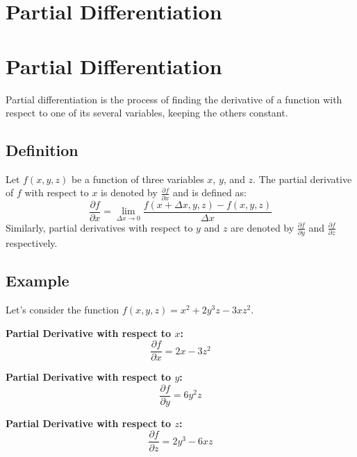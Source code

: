 \documentclass[a4paper,12pt]{article}
\begin{document}
\pagestyle{empty} 

\section{\huge\textbf{Partial Differentiation}}



\section*{Partial Differentiation}

Partial differentiation is the process of finding the derivative of a function with respect to one of its several variables, keeping the others constant.

\subsection*{Definition}

Let \( f(x, y, z) \) be a function of three variables \( x \), \( y \), and \( z \). The partial derivative of \( f \) with respect to \( x \) is denoted by \( \frac{\partial f}{\partial x} \) and is defined as:
\[
\frac{\partial f}{\partial x} = \lim_{\Delta x \to 0} \frac{f(x + \Delta x, y, z) - f(x, y, z)}{\Delta x}
\]
Similarly, partial derivatives with respect to \( y \) and \( z \) are denoted by \( \frac{\partial f}{\partial y} \) and \( \frac{\partial f}{\partial z} \) respectively.

\subsection*{Example}

Let's consider the function \( f(x, y, z) = x^2 + 2y^3z - 3xz^2 \). 

\textbf{Partial Derivative with respect to \( x \):}
\[
\frac{\partial f}{\partial x} = 2x - 3z^2
\]

\textbf{Partial Derivative with respect to \( y \):}
\[
\frac{\partial f}{\partial y} = 6y^2z
\]

\textbf{Partial Derivative with respect to \( z \):}
\[
\frac{\partial f}{\partial z} = 2y^3 - 6xz
\]
\end{document}
